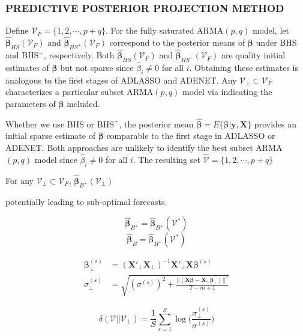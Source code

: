 \subsubsection{PREDICTIVE POSTERIOR PROJECTION METHOD}

Define $\mathcal{V}_F=\{1,2,\cdots,p+q\}$. For the fully saturated ARMA$(p,q)$ model, let $\hat{\bm{\beta}}_{HS}(\mathcal{V}_F)$ and $\hat{\bm{\beta}}_{HS^{+}}(\mathcal{V}_F)$ correspond to the posterior means of $\bm{\beta}$ under BHS and $\textrm{BHS}^+$, respectively. Both $\hat{\bm{\beta}}_{HS}(\mathcal{V}_F)$ and $\hat{\bm{\beta}}_{HS^{+}}(\mathcal{V}_F)$ are quality initial estimates of $\bm{\beta}$ but not sparse since $\hat{\beta}_i \neq 0$ for all $i$. Obtaining these estimates is analogous to the first stages of ADLASSO and ADENET. Any $\mathcal{V}_\perp \subset \mathcal{V}_F$ characterizes a particular subset ARMA$(p,q)$ model via indicating the parameters of $\bm{\beta}$ included.



Whether we use BHS or $\textrm{BHS}^+$, the posterior mean $\hat{\bm{\beta}}=E\{\bm{\beta}|\bm{y},\bm{X}\}$ provides an initial sparse estimate of $\bm{\beta}$ comparable to the first stage in ADLASSO or ADENET.  Both approaches are unlikely to identify the best subset ARMA$(p,q)$ model since $\hat{\beta}_i \neq 0$ for all $i$.  The resulting set $\widehat{\mathcal{V}}=\{1,2,\cdots,p+q\}$

For any $\mathcal{V}_\perp \subset \mathcal{V}_F$,  $\hat{\bm{\beta}}_{B^{+}}(\mathcal{V}_\perp)$ 

 potentially leading to sub-optimal forecasts. 

$$\hat{\bm{\beta}}_{B^{+}}=\hat{\bm{\beta}}_{B^{+}}(\mathcal{V}^*)$$
$$\hat{\bm{\beta}}_{B}=\hat{\bm{\beta}}_{B^{+}}(\mathcal{V}^*)$$


\begin{equation}
\begin{split}
	\bm{\beta}^{(s)}_\perp &= (\bm{X}'_\perp\bm{X}_\perp)^{-1}\bm{X}'_\perp\bm{X}\bm{\beta}^{(s)} \\
	\sigma^{(s)}_\perp &=\sqrt{(\sigma^{(s)})^2+\frac{||(\bm{X}\bm{\beta}-\bm{X}_\perp \bm{\beta}_\perp)||^2}{T-m+1}}
\end{split}
\end{equation}

\begin{equation}
	\delta(\mathcal{V}||\mathcal{V}_\perp)=\frac{1}{S}\sum\limits_{s=1}^S \log\bigg(\frac{\sigma^{(s)}_\perp}{\sigma^{(s)}}\bigg)
\end{equation}

